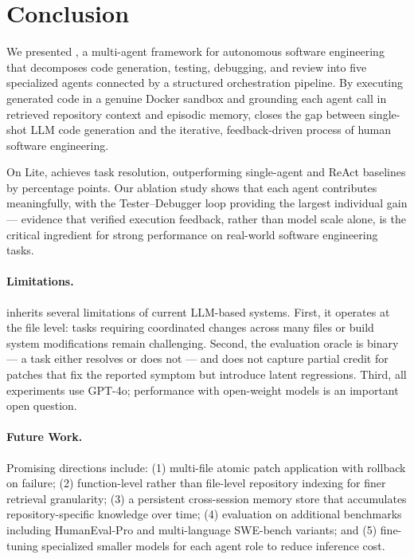 
\section{Conclusion}
\label{sec:conclusion}

We presented \agentforge{}, a multi-agent framework for
autonomous software engineering that decomposes code
generation, testing, debugging, and review into five
specialized agents connected by a structured orchestration
pipeline. By executing generated code in a genuine
Docker sandbox and grounding each agent call in retrieved
repository context and episodic memory, \agentforge{}
closes the gap between single-shot LLM code generation
and the iterative, feedback-driven process of human
software engineering.

On \swebench{} Lite, \agentforge{} achieves 
task resolution, outperforming single-agent and ReAct
baselines by  percentage points. Our ablation
study shows that each agent contributes meaningfully,
with the Tester--Debugger loop providing the largest
individual gain — evidence that verified execution
feedback, rather than model scale alone, is the critical
ingredient for strong performance on real-world
software engineering tasks.

\paragraph{Limitations.}
\agentforge{} inherits several limitations of current
LLM-based systems. First, it operates at the file level:
tasks requiring coordinated changes across many files or
build system modifications remain challenging.
Second, the evaluation oracle is binary — a task either
resolves or does not — and does not capture partial credit
for patches that fix the reported symptom but introduce
latent regressions.
Third, all experiments use GPT-4o; performance with
open-weight models is an important open question.

\paragraph{Future Work.}
Promising directions include: (1) multi-file atomic patch
application with rollback on failure; (2) function-level
rather than file-level repository indexing for finer
retrieval granularity; (3) a persistent cross-session
memory store that accumulates repository-specific
knowledge over time; (4) evaluation on additional
benchmarks including HumanEval-Pro and
multi-language SWE-bench variants; and
(5) fine-tuning specialized smaller models for each
agent role to reduce inference cost.

